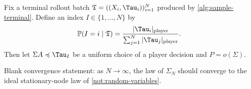 \documentclass[12pt, a4paper]{article}
\begin{document}
\begin{definition}\label{def:terminal-rollout-decision-law}
Fix a terminal rollout batch $\mathfrak{T}=((X_i,\Tau_i))_{i=1}^N$ produced by \cref{alg:sample-terminal}.
Define an index $I\in\{1,\ldots,N\}$ by
\begin{equation}\label{eq:terminal-rollout-index-law}
  \mathbb{P}(I=i\mid\mathfrak{T})
  =
  \frac{|\Tau_i|_{\textnormal{player}}}
       {\sum_{j=1}^N|\Tau_j|_{\textnormal{player}}}.
\end{equation}
Then let $\Sigma A \preccurlyeq \Tau_I$ be a uniform choice of a player decision and $P = o(\Sigma)$.

{\color{red}Blank convergence statement: as $N\to\infty$, the law of $\Sigma_N$ should converge to the ideal stationary-node law of \autoref{not:random-variables}.}
\end{definition}
\end{document}
